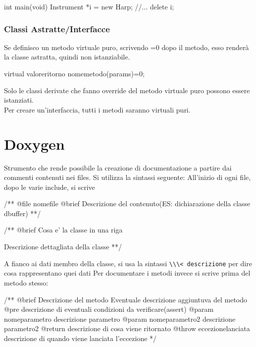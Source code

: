 \begin{cpp}
int main(void) {
	Instrument *i = new Harp;
	//...
	delete i;
}
\end{cpp}

\subsection{Classi Astratte/Interfacce}
Se definisco un metodo virtuale puro, scrivendo =0 dopo il metodo, esso renderà la classe astratta, quindi non istanziabile. 

\begin{cpp}
virtual valoreritorno nomemetodo(params)=0;
\end{cpp}

Solo le classi derivate che fanno override del metodo virtuale puro possono essere istanziati.\\
Per creare un'interfaccia, tutti i metodi saranno virtuali puri.

\chapter{Doxygen}
Strumento che rende possibile la creazione di documentazione a partire dai commenti contenuti nei files.
Si utilizza la sintassi seguente:
All'inizio di ogni file, dopo le varie include, si scrive

\begin{cpp}
/**
@file nomefile
@brief Descrizione del contenuto(ES: dichiarazione della classe dbuffer)
**/

/**
@brief Cosa e' la classe in una riga

Descrizione dettagliata della classe
**/
\end{cpp}

A fianco ai dati membro della classe, si usa la sintassi \verb|\\\< descrizione| per dire cosa rappresentano quei dati
\newpage
Per documentare i metodi invece si scrive prima del metodo stesso:

\begin{cpp}
/**
	@brief Descrizione del metodo 
	Eventuale descrizione aggiuntuva del metodo
	@pre descrizione di eventuali condizioni da verificare(assert)
	@param nomeparametro descrizione parametro
	@param nomeparametro2 descrizione parametro2
	@return descrizione di cosa viene ritornato
	@throw eccezionelanciata descrizione di quando viene lanciata l'eccezione
*/
\end{cpp}


